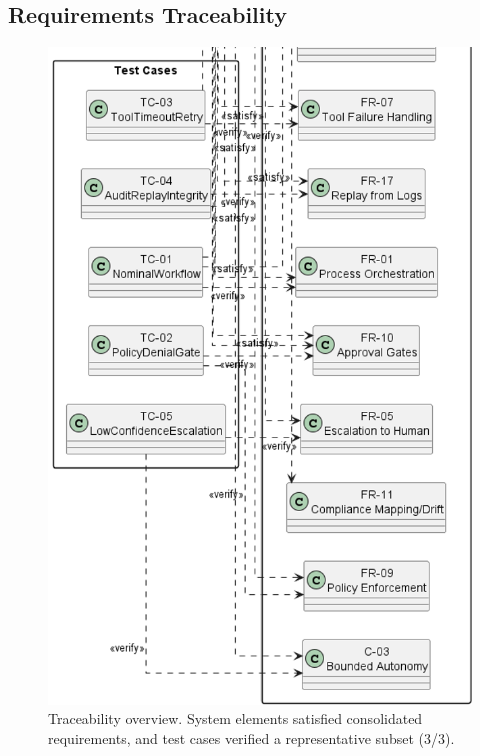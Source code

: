 \subsection{Requirements Traceability}\label{app:trace}
\begin{figure}[htbp]
  \centering
  \includegraphics[width=0.6\linewidth]{ressources/MAS/diagrams/MASTraceability3.png}
  \caption{Traceability overview. System elements satisfied consolidated requirements, and test cases verified a representative subset (3/3).}
  \label{fig:app-mas-traceability}
\end{figure}

\clearpage



\clearpage

